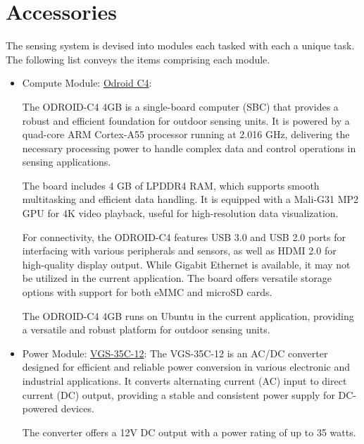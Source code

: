 \documentclass[12pt]{article}
\begin{document}
\section{Accessories}
The sensing system is devised into modules each tasked with each a unique task. The following list conveys the items comprising each module. 

\begin{itemize}
    \item Compute Module: \href{https://ameridroid.com/products/odroid-c4}{Odroid C4}: 

    The ODROID-C4 4GB is a single-board computer (SBC) that provides a robust and efficient foundation for outdoor sensing units. It is powered by a quad-core ARM Cortex-A55 processor running at 2.016 GHz, delivering the necessary processing power to handle complex data and control operations in sensing applications.
    
    The board includes 4 GB of LPDDR4 RAM, which supports smooth multitasking and efficient data handling. It is equipped with a Mali-G31 MP2 GPU for 4K video playback, useful for high-resolution data visualization.
    
    For connectivity, the ODROID-C4 features USB 3.0 and USB 2.0 ports for interfacing with various peripherals and sensors, as well as HDMI 2.0 for high-quality display output. While Gigabit Ethernet is available, it may not be utilized in the current application. The board offers versatile storage options with support for both eMMC and microSD cards.
    
    The ODROID-C4 4GB runs on Ubuntu in the current application, providing a versatile and robust platform for outdoor sensing units.
    
    \item Power Module: \href{https://www.digikey.com/en/products/detail/cui-inc/VGS-35C-12/13538494}{VGS-35C-12}:
        The VGS-35C-12 is an AC/DC converter designed for efficient and reliable power conversion in various electronic and industrial applications. It converts alternating current (AC) input to direct current (DC) output, providing a stable and consistent power supply for DC-powered devices.
        
        The converter offers a 12V DC output with a power rating of up to 35 watts.
        

\end{itemize}
\end{document}
